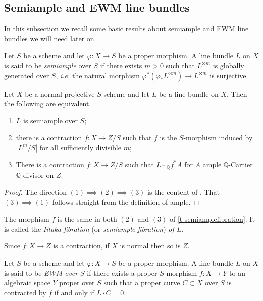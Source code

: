 \documentclass[a4paper,12pt]{book}
\begin{document}
	
	\subsection{Semiample and EWM line bundles}
	
	In this subsection we recall some basic results about semiample and EWM line bundles we will need later on. 
	
	\begin{definition}
		Let $S$ be a scheme and let $\varphi \colon X \to S$ be a proper morphism. A line bundle $L$ on $X$ is said to be \textit{semiample} over $S$ if there exists $m>0$ such that $L^{\otimes m}$ is globally generated over $S$, \emph{i.e.} the natural morphism $\varphi^*(\varphi_*L^{\otimes m}) \to L^{\otimes m}$ is surjective.
	\end{definition} 
	
	\begin{theorem}\label{t-semiamplefibration}
		Let $X$ be a normal projective $S$-scheme and let $L$ be a line bundle on $X$. Then the following are equivalent.
		\begin{enumerate}
			\item $L$ is semiample over $S$;
			\item there is a contraction 
			$f\colon X\to Z/S$
			such that $f$ is the $S$-morphism induced by $|L^m/S|$ for all sufficiently divisible $m$;
			\item There is a contraction 
			$f\colon X\to Z/S$
			such that $L\sim_{\mathbb{Q}} f^{*}A$ for $A$ ample $\mathbb{Q}$-Cartier $\mathbb{Q}$-divisor on $Z$.
		\end{enumerate}
	\end{theorem}
	
	\begin{proof}
		The direction $(1) \implies (2) \implies (3)$ is the content of \cite[Theorem 2.1.26]{La1}. That $(3) \implies (1)$ follows straight from the definition of ample.
	\end{proof}
	
	The morphism $f$ is the same in both $(2)$ and $(3)$ of \autoref{t-semiamplefibration}. It is called the \textit{Iitaka fibration} (or \textit{semiample fibration}) \textit{of $L$}. 
	
	\begin{remark}
		Since $f \colon X \to Z$ is a contraction, if $X$ is normal then so is $Z$.
	\end{remark}
	
	\begin{definition}
		Let $S$ be a scheme and let $\varphi \colon X \to S$ be a proper morphism. A line bundle $L$ on $X$ is said to be \emph{EWM over $S$} if there
		exists a proper $S$-morphism $f \colon X \rightarrow Y $ to an algebraic space $Y$ proper over $S$ such that a proper curve $C \subset X$ over $S$ is contracted by $f$ if and only if
		$L \cdot C = 0$.
	\end{definition}
	
\end{document}
